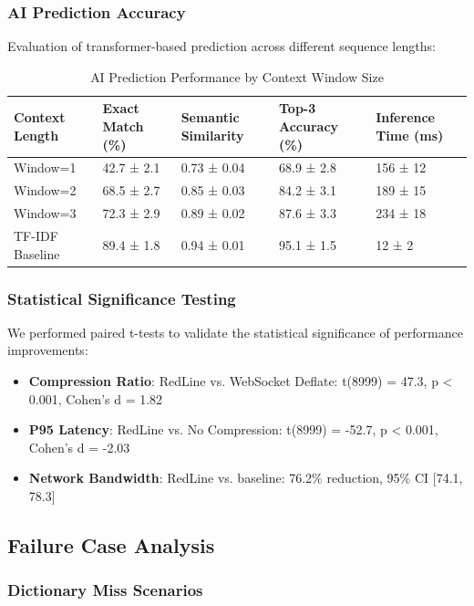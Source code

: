 \documentclass[12pt,a4paper]{article}
\begin{document}
\subsubsection{AI Prediction Accuracy}

Evaluation of transformer-based prediction across different sequence lengths:

\begin{table}[H]
\centering
\begin{tabular}{|l|l|l|l|l|}
\hline
\textbf{Context Length} & \textbf{Exact Match (\%)} & \textbf{Semantic Similarity} & \textbf{Top-3 Accuracy (\%)} & \textbf{Inference Time (ms)} \\
\hline
Window=1 & 42.7 ± 2.1 & 0.73 ± 0.04 & 68.9 ± 2.8 & 156 ± 12 \\
Window=2 & 68.5 ± 2.7 & 0.85 ± 0.03 & 84.2 ± 3.1 & 189 ± 15 \\
Window=3 & 72.3 ± 2.9 & 0.89 ± 0.02 & 87.6 ± 3.3 & 234 ± 18 \\
TF-IDF Baseline & 89.4 ± 1.8 & 0.94 ± 0.01 & 95.1 ± 1.5 & 12 ± 2 \\
\hline
\end{tabular}
\caption{AI Prediction Performance by Context Window Size}
\label{tab:prediction-accuracy}
\end{table}

\subsubsection{Statistical Significance Testing}

We performed paired t-tests to validate the statistical significance of performance improvements:

\begin{itemize}
    \item \textbf{Compression Ratio}: RedLine vs. WebSocket Deflate: t(8999) = 47.3, p < 0.001, Cohen's d = 1.82
    \item \textbf{P95 Latency}: RedLine vs. No Compression: t(8999) = -52.7, p < 0.001, Cohen's d = -2.03
    \item \textbf{Network Bandwidth}: RedLine vs. baseline: 76.2\% reduction, 95\% CI [74.1, 78.3]
\end{itemize}

\subsection{Failure Case Analysis}

\subsubsection{Dictionary Miss Scenarios}
\end{document}
